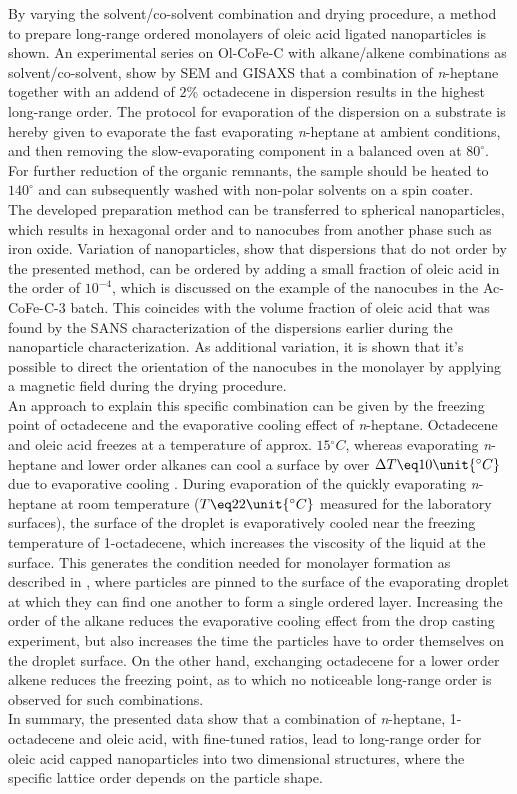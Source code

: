\documentclass[\main/dresen_thesis.tex]{subfiles}
\begin{document}
  By varying the solvent/co-solvent combination and drying procedure, a method to prepare long-range ordered monolayers of oleic acid ligated nanoparticles is shown.
  An experimental series on Ol-CoFe-C with alkane/alkene combinations as solvent/co-solvent, show by SEM and GISAXS that a combination of \textit{n}-heptane together with an addend of $2 \%$ octadecene in dispersion results in the highest long-range order.
  The protocol for evaporation of the dispersion on a substrate is hereby given to evaporate the fast evaporating \textit{n}-heptane at ambient conditions, and then removing the slow-evaporating component in a balanced oven at $80 ^\circ$.
  For further reduction of the organic remnants, the sample should be heated to $140 ^\circ$ and can subsequently washed with non-polar solvents on a spin coater.
  \\

  The developed preparation method can be transferred to spherical nanoparticles, which results in hexagonal order and to nanocubes from another phase such as iron oxide.
  Variation of nanoparticles, show that dispersions that do not order by the presented method, can be ordered by adding a small fraction of oleic acid in the order of $10^{-4}$, which is discussed on the example of the nanocubes in the Ac-CoFe-C-3 batch.
  This coincides with the volume fraction of oleic acid that was found by the SANS characterization of the dispersions earlier during the nanoparticle characterization.
  As additional variation, it is shown that it's possible to direct the orientation of the nanocubes in the monolayer by applying a magnetic field during the drying procedure.
  \\

  An approach to explain this specific combination can be given by the freezing point of octadecene and the evaporative cooling effect of \textit{n}-heptane.
  Octadecene and oleic acid freezes at a temperature of approx. $15 \unit{^\circ C}$, whereas evaporating \textit{n}-heptane and lower order alkanes can cool a surface by over $\Delta T \eq 10 \unit{^\circ C}$ due to evaporative cooling \cite{Tuckermann_2002_Evapo}.
  During evaporation of the quickly evaporating \textit{n}-heptane at room temperature ($T \eq 22 \unit{^\circ C}$ measured for the laboratory surfaces), the surface of the droplet is evaporatively cooled near the freezing temperature of 1-octadecene, which increases the viscosity of the liquid at the surface.
  This generates the condition needed for monolayer formation as described in \cite{Bigioni_2006_Kinet}, where particles are pinned to the surface of the evaporating droplet at which they can find one another to form a single ordered layer.
  Increasing the order of the alkane reduces the evaporative cooling effect from the drop casting experiment, but also increases the time the particles have to order themselves on the droplet surface.
  On the other hand, exchanging octadecene for a lower order alkene reduces the freezing point, as to which no noticeable long-range order is observed for such combinations.
  \\

  In summary, the presented data show that a combination of \textit{n}-heptane, 1-octadecene and oleic acid, with fine-tuned ratios, lead to long-range order for oleic acid capped nanoparticles into two dimensional structures, where the specific lattice order depends on the particle shape.
\end{document}
